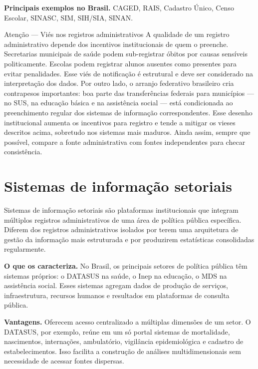\textbf{Principais exemplos no Brasil.} CAGED, RAIS, Cadastro Único, Censo Escolar, SINASC, SIM, SIH/SIA, SINAN.

\begin{boxatencao}{Atenção — Viés nos registros administrativos}
A qualidade de um registro administrativo depende dos incentivos institucionais de quem o preenche. Secretarias municipais de saúde podem sub-registrar óbitos por causas sensíveis politicamente. Escolas podem registrar alunos ausentes como presentes para evitar penalidades. Esse viés de notificação é estrutural e deve ser considerado na interpretação dos dados. Por outro lado, o arranjo federativo brasileiro cria contrapesos importantes: boa parte das transferências federais para municípios --- no SUS, na educação básica e na assistência social --- está condicionada ao preenchimento regular dos sistemas de informação correspondentes. Esse desenho institucional aumenta os incentivos para registro e tende a mitigar os vieses descritos acima, sobretudo nos sistemas mais maduros. Ainda assim, sempre que possível, compare a fonte administrativa com fontes independentes para checar consistência.
\end{boxatencao}

\section{Sistemas de informação setoriais}

Sistemas de informação setoriais são plataformas institucionais que integram múltiplos registros administrativos de uma área de política pública específica. Diferem dos registros administrativos isolados por terem uma arquitetura de gestão da informação mais estruturada e por produzirem estatísticas consolidadas regularmente.

\textbf{O que os caracteriza.} No Brasil, os principais setores de política pública têm sistemas próprios: o DATASUS na saúde, o Inep na educação, o MDS na assistência social. Esses sistemas agregam dados de produção de serviços, infraestrutura, recursos humanos e resultados em plataformas de consulta pública.

\textbf{Vantagens.} Oferecem acesso centralizado a múltiplas dimensões de um setor. O DATASUS, por exemplo, reúne em um só portal sistemas de mortalidade, nascimentos, internações, ambulatório, vigilância epidemiológica e cadastro de estabelecimentos. Isso facilita a construção de análises multidimensionais sem necessidade de acessar fontes dispersas.

